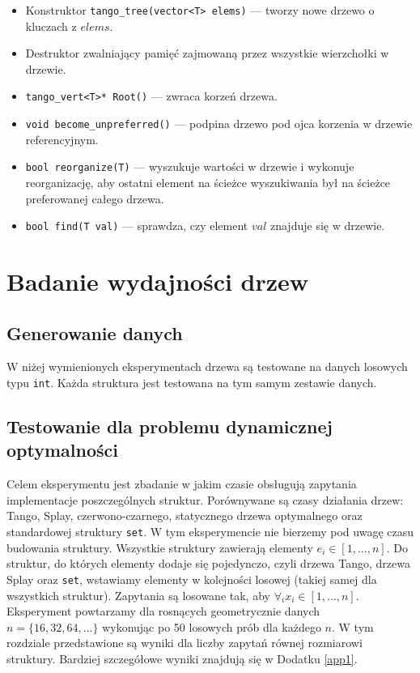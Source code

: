 \documentclass[declaration,shortabstract]{iithesis}
\theoremstyle{thm}
\theoremstyle{remark}
\theoremstyle{plain}
\theoremstyle{plain}
\theoremstyle{plain}
\begin{document}
\begin{itemize}

\item{Konstruktor \texttt{tango\_tree(vector<T> elems)} --- tworzy nowe drzewo o kluczach z $elems$.}

\item{Destruktor zwalniający pamięć zajmowaną przez wszystkie wierzchołki w drzewie.}

\item{\texttt{tango\_vert<T>* Root()} --- zwraca korzeń drzewa.}

\item{\texttt{void become\_unpreferred()} --- podpina drzewo pod ojca korzenia w drzewie referencyjnym.}

\item{\texttt{bool reorganize(T)} --- wyszukuje wartości w drzewie i wykonuje reorganizację, aby ostatni element na ścieżce wyszukiwania był na ścieżce preferowanej całego drzewa.}

\item{\texttt{bool find(T val)} --- sprawdza, czy element $val$ znajduje się w drzewie.}
       

\end{itemize}


\chapter{Badanie wydajności drzew}
\section{Generowanie danych}
W niżej wymienionych eksperymentach drzewa są testowane na danych losowych typu \texttt{int}. Każda struktura jest testowana na tym samym zestawie danych.

\section{Testowanie dla problemu dynamicznej optymalności}
Celem eksperymentu jest zbadanie w jakim czasie obsługują zapytania implementacje poszczególnych struktur. Porównywane są czasy działania drzew: Tango, Splay, czerwono-czarnego, statycznego drzewa optymalnego oraz standardowej struktury \texttt{set}. W tym eksperymencie nie bierzemy pod uwagę czasu budowania struktury. Wszystkie struktury zawierają elementy \(e_i \in [1, ..., n]\). Do struktur, do których elementy dodaje się pojedynczo, czyli drzewa Tango, drzewa Splay oraz \texttt{set}, wstawiamy elementy w kolejności losowej (takiej samej dla wszystkich struktur). Zapytania są losowane tak, aby \(\forall_i x_i \in [1, ..., n]\). Eksperyment powtarzamy dla rosnących geometrycznie danych \( n = \{16, 32, 64, ...\}\) wykonując po 50 losowych prób dla każdego $n$. W tym rozdziale przedstawione są wyniki dla liczby zapytań równej rozmiarowi struktury. Bardziej szczegółowe wyniki znajdują się w Dodatku \ref{app1}.
 
\end{document}
